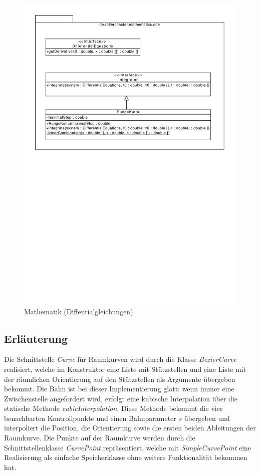 \begin{figure}
\includegraphics[width=\linewidth]{bilder/Mathematics_ODE}
\caption{Mathematik (Diffentialgleichungen)}
\label{fig:ode}
\end{figure}

\subsection{Erläuterung}
Die Schnittstelle \emph{Curve} für Raumkurven wird durch die Klasse \emph{BezierCurve} 
realisiert, welche im Konstruktor eine Liste mit Stützstellen und eine Liste mit der
räumlichen Orientierung auf den Stützstellen als Argumente übergeben bekommt. Die Bahn
ist bei dieser Implementierung glatt: wenn immer eine Zwischenstelle angefordert wird,
erfolgt eine kubische Interpolation über die statische Methode \emph{cubicInterpolation}.
Diese Methode bekommt die vier benachbarten Kontrollpunkte und einen Bahnparameter $s$
übergeben und interpoliert die Position, die Orientierung sowie die ersten beiden 
Ableitungen der Raumkurve. 
Die Punkte auf der Raumkurve werden durch die Schnittstellenklasse \emph{CurvePoint}
repräsentiert, welche mit \emph{SimpleCurvePoint} eine Realisierung als einfache
Speicherklasse ohne weitere Funktionalität bekommen hat.

